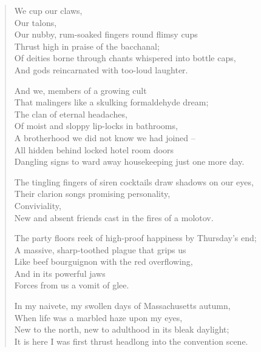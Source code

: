 \begin{verse}
  We cup our claws,\\
  Our talons,\\
  Our nubby, rum-soaked fingers round flimsy cups\\
  Thrust high in praise of the bacchanal;\\
  Of deities borne through chants whispered into bottle caps,\\
  And gods reincarnated with too-loud laughter.\par

  And we, members of a growing cult\\
  That malingers like a skulking formaldehyde dream;\\
  The clan of eternal headaches,\\
  Of moist and sloppy lip-locks in bathrooms,\\
  A brotherhood we did not know we had joined --\\
  All hidden behind locked hotel room doors\\
  Dangling signs to ward away housekeeping just one more day.\par

  The tingling fingers of siren cocktails draw shadows on our eyes,\\
  Their clarion songs promising personality,\\
  Conviviality,\\
  New and absent friends cast in the fires of a molotov.\par

  The party floors reek of high-proof happiness by Thursday's end;\\
  A massive, sharp-toothed plague that grips us\\
  Like beef bourguignon with the red overflowing,\\
  And in its powerful jaws\\
  Forces from us a vomit of glee.\\

  \secdiv

  In my naivete, my swollen days of Massachusetts autumn,\\
  When life was a marbled haze upon my eyes,\\
  New to the north, new to adulthood in its bleak daylight;\\
  It is here I was first thrust headlong into the convention scene.\par


\end{verse}
